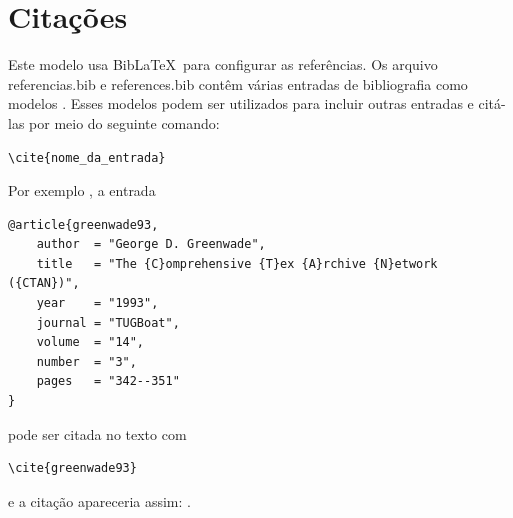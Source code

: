 \chapter{Citações}

Este modelo usa Bib\LaTeX\ para configurar as referências. Os arquivo referencias.bib e references.bib contêm várias entradas de bibliografia como modelos \cite{article,book,booklet,inbook}. Esses modelos podem ser utilizados para incluir outras entradas e citá-las por meio do seguinte comando:
\begin{verbatim}
\cite{nome_da_entrada}
\end{verbatim}

Por exemplo , a entrada
\begin{verbatim}
@article{greenwade93,
    author  = "George D. Greenwade",
    title   = "The {C}omprehensive {T}ex {A}rchive {N}etwork ({CTAN})",
    year    = "1993",
    journal = "TUGBoat",
    volume  = "14",
    number  = "3",
    pages   = "342--351"
}
\end{verbatim}
pode ser citada no texto com
\begin{verbatim}
\cite{greenwade93}
\end{verbatim}
e a citação apareceria assim: \cite{greenwade93}.

